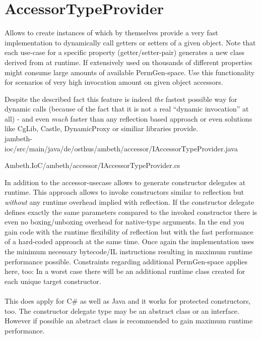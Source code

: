 \section{AccessorTypeProvider}
\label{feature:AccessorTypeProvider}
\ClearAPI
Allows to create instances of  which by themselves provide a very fast implementation to dynamically call getters or setters of a given object. Note that each use-case for a specific property (getter/setter-pair) generates a new class derived from  at runtime. If extensively used on thousands of different properties might consume large amounts of available PermGen-space. Use this functionality for scenarios of very high invocation amount on given object accessors.

Despite the described fact this feature is indeed \emph{the} fastest possible way for dynamic calls (because of the fact that it is not a real ``dynamic invocation'' at all) - and even \emph{much} faster than any reflection based approach or even solutions like CgLib, Castle, DynamicProxy or similiar libraries provide.\\

{jambeth-ioc/src/main/java/de/osthus/ambeth/accessor/IAccessorTypeProvider.java}

{Ambeth.IoC/ambeth/accessor/IAccessorTypeProvider.cs}

In addition to the accessor-usecase  allows to generate constructor delegates at runtime. This approach allows to invoke constructors similar to reflection but \emph{without} any runtime overhead implied with reflection. If the constructor delegate defines exactly the same parameters compared to the invoked constructor there is even no boxing/unboxing overhead for native-type arguments. In the end you gain code with the runtime flexibility of reflection but with the fast performance of a hard-coded approach at the same time. Once again the implementation uses the minimum necessary bytecode/IL instructions resulting in maximum runtime performance possible. Constraints regarding additional PermGen-space applies here, too: In a worst case there will be an additional runtime class created for each unique target constructor.\\\\

This does apply for C\# as well as Java and it works for protected constructors, too. The constructor delegate type may be an abstract class or an interface. However if possible an abstract class is recommended to gain maximum runtime performance.

